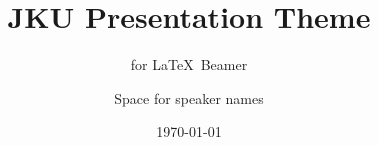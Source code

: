 \documentclass[utf8,aspectratio=169,ngerman,english]{beamer}
\begin{document}


\title{JKU Presentation Theme}

\subtitle{for \LaTeX\ Beamer}

\author{Space for speaker names}



\date{\today}





\end{document}
